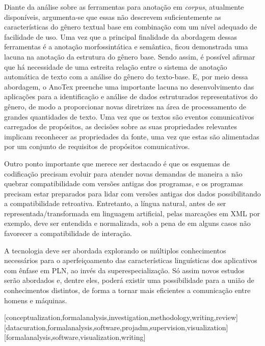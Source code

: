 \documentclass[portuguese]{textolivre}
\begin{document}
Diante da análise sobre as ferramentas para anotação em \textit{corpus}, atualmente disponíveis, argumenta-se que essas não descrevem suficientemente as características do gênero textual base em combinação com um nível adequado de facilidade de uso. Uma vez que a principal finalidade da abordagem dessas ferramentas é a anotação morfossintática e semântica, ficou demonstrada uma lacuna na anotação da estrutura do gênero base. Sendo assim, é possível afirmar que há necessidade de uma estreita relação entre o sistema de anotação automática de texto com a análise do gênero do texto-base. E, por meio dessa abordagem, o AnoTex preenche uma importante lacuna no desenvolvimento das aplicações para a identificação e análise de dados estruturados representativos do gênero, de modo a proporcionar novas diretrizes na área de processamento de grandes quantidades de texto. Uma vez que os textos são eventos comunicativos carregados de propósitos, as decisões sobre as suas propriedades relevantes implicam reconhecer as propriedades da fonte, uma vez que estas são alimentadas por um conjunto de requisitos de propósitos comunicativos.
 
Outro ponto importante que merece ser destacado é que os esquemas de codificação precisam evoluir para atender novas demandas de maneira a não quebrar compatibilidade com versões antigas dos programas, e os programas precisam estar preparados para lidar com versões antigas dos dados possibilitando a compatibilidade retroativa. Entretanto, a língua natural, antes de ser representada/transformada em linguagem artificial, pelas marcações em XML por exemplo, deve ser entendida e normalizada, sob a pena de em alguns casos não favorecer a compatibilidade de interação.

A tecnologia deve ser abordada explorando os múltiplos conhecimentos necessários para o aperfeiçoamento das características linguísticas dos aplicativos com ênfase em PLN, ao invés da superespecialização. Só assim novos estudos serão abordados e, dentre eles, poderá existir uma possibilidade para a união de conhecimentos distintos, de forma a tornar mais eficientes a comunicação entre homens e máquinas. 

\printbibliography\label{sec-bib}


\begin{contributors}
[conceptualization,formalanalysis,investigation,methodology,writing,review]
[datacuration,formalanalysis,software,projadm,supervision,visualization]
[formalanalysis,software,visualization,writing]
\end{contributors}
\end{document}
